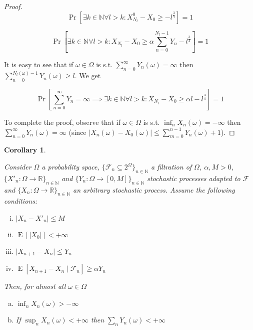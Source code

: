 \documentclass[aop,preprint]{imsart}
\numberwithin{equation}{section}
\theoremstyle{definition}
\theoremstyle{plain}
\newtheorem{corollary}{Corollary}[section]
\newcommand{\Nats}{\mathbb{N}}
\newcommand{\Reals}{\mathbb{R}}
\newcommand{\A}[1]{\lvert #1 \rvert}
\newcommand{\Sq}[2]{\{#1\}_{#2 \in \Nats}}
\newcommand{\Sqn}[1]{\Sq{#1}{n}}
\DeclareMathOperator{\E}{E}
\newcommand{\F}{\mathcal{F}}
\begin{document}
\begin{proof}
$$\Pr\left[\exists k \in \Nats \forall l > k: X^0_{N_l} - X_0 \geq -l^{\frac{3}{4}}\right] = 1$$

$$\Pr\left[\exists k \in \Nats \forall l > k: X_{N_l} - X_0 \geq \alpha \sum_{n=0}^{N_l - 1} Y_n - l^{\frac{3}{4}}\right] = 1$$


It is easy to see that if $\omega \in \Omega$ is s.t. $\sum_{n=0}^\infty Y_n\left(\omega\right) = \infty$ then $\sum_{n=0}^{N_l\left(\omega\right) - 1} Y_n\left(\omega\right) \geq l$. We get

$$\Pr\left[\sum_{n=0}^\infty  Y_n = \infty \implies \exists k \in \Nats \forall l > k: X_{N_l} - X_0 \geq \alpha l - l^{\frac{3}{4}}\right]=1$$

To complete the proof, observe that if ${\omega \in \Omega}$ is s.t. ${\inf_n X_n\left(\omega\right) = -\infty}$ then ${\sum_{n=0}^\infty  Y_n\left(\omega\right) = \infty}$ (since ${\A{X_n\left(\omega\right) - X_0\left(\omega\right)} \leq \sum_{m=0}^{n-1} Y_n\left(\omega\right) + 1}$).
\end{proof}

\begin{samepage}
\begin{corollary}
\label{crl:prudent}

Consider $\Omega$ a probability space, $\Sqn{\F_n \subseteq 2^\Omega}$ a filtration of $\Omega$, $\alpha,M > 0$, $\Sqn{X'_n: \Omega \rightarrow \Reals}$ and $\Sqn{Y_n: \Omega \rightarrow \left[0,M\right]}$ stochastic processes adapted to $\F$ and $\Sqn{X_n: \Omega \rightarrow \Reals}$ an arbitrary stochastic process. Assume the following conditions:

\begin{enumerate}[i.]

\item $\A{X_n - X'_n} \leq M$
\item $\E\left[\A{X_0}\right] < +\infty$
\item $\A{X_{n+1} - X_n} \leq Y_n$
\item $\E\left[X_{n+1} - X_n \mid \F_n\right] \geq \alpha Y_n$

\end{enumerate}

Then, for almost all $\omega \in \Omega$

\begin{enumerate}[a.]

\item\label{itm:crl_prudent__inf} $\inf_n X_n\left(\omega\right) > -\infty$
\item\label{itm:crl_prudent__sup} If $\sup_n X_n\left(\omega\right) < +\infty$ then $\sum_n Y_n\left(\omega\right) < +\infty$

\end{enumerate}

\end{corollary}
\end{samepage}
\end{document}
